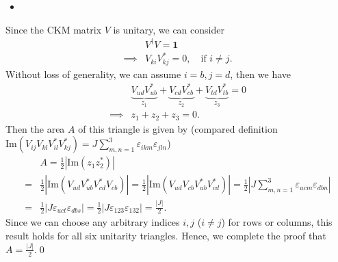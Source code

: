 \begin{itemize}
    \item [(b)]
\end{itemize}
Since the CKM matrix $V$ is unitary, we can consider 
\begin{align}
    &V^\dagger V = \mathbf{1}\\
    \implies &V_{ki}V_{kj}^*=0,\quad\text{if $i\neq j$}.
\end{align}
Without loss of generality, we can assume $i=b,j=d$, then we have 
\begin{align}
    &\underbrace{V_{ud}V_{ub}^*}_{z_1} + \underbrace{V_{cd} V_{cb}^*}_{z_2} + \underbrace{V_{td}V_{tb}^*}_{z_3}=0\\
    \implies& z_1+z_2+z_3=0.
\end{align}
Then the area $A$ of this triangle is given by (compared definition $\text{Im}(V_{ij} V_{kl} V_{il}^* V_{kj}^*) = J \sum_{m,n=1}^3 \varepsilon_{ikm} \varepsilon_{jln}$)
\begin{align}
    &A= \frac{1}{2}|\text{Im}(z_1 z_2^*)|\\
    =&\frac{1}{2}\left|\text{Im} (V_{ud}V_{ub}^*  V_{cd}^* V_{cb})\right|= \frac{1}{2}\left|\text{Im} (V_{ud} V_{cb}V_{ub}^* V_{cd}^*)\right|=\frac{1}{2}\left|J \sum_{m,n=1}^3 \varepsilon_{ucm} \varepsilon_{dbn}\right|\\
    =&\frac{1}{2}\left|J  \varepsilon_{uct} \varepsilon_{dbs}\right|=\frac{1}{2}\left|J\varepsilon_{123}\varepsilon_{132}\right|=\frac{|J|}{2}.
\end{align}
Since we can choose any arbitrary indices $i, j$ ($i \neq j$) for rows or columns, this result holds for all six unitarity triangles. Hence, we complete the proof that $A = \frac{|J|}{2}$.\qed